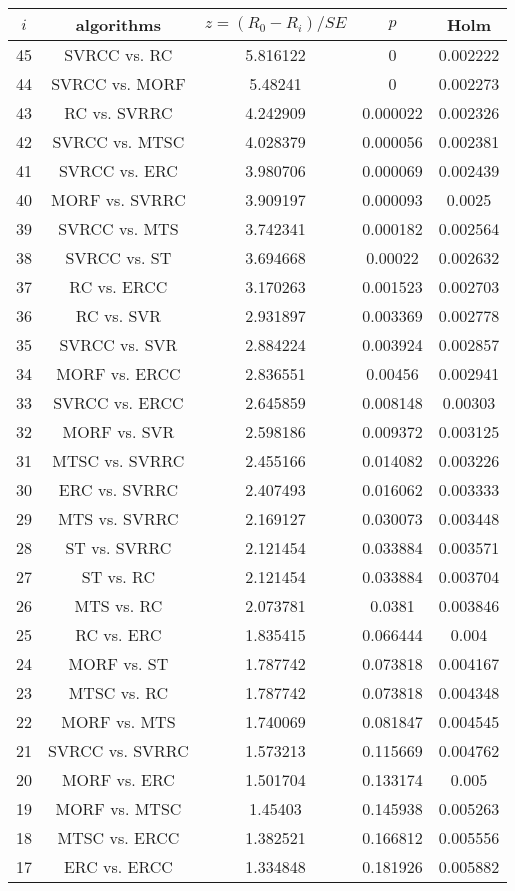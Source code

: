 \documentclass[a4paper,10pt]{article}
\begin{document}
\begin{landscape}
\begin{table}[!htp]
\centering\scriptsize
\begin{tabular}{ccccc}
$i$&algorithms&$z=(R_0 - R_i)/SE$&$p$&Holm\\
\hline45&SVRCC vs. RC&5.816122&0&0.002222\\
44&SVRCC vs. MORF&5.48241&0&0.002273\\
43&RC vs. SVRRC&4.242909&0.000022&0.002326\\
42&SVRCC vs. MTSC&4.028379&0.000056&0.002381\\
41&SVRCC vs. ERC&3.980706&0.000069&0.002439\\
40&MORF vs. SVRRC&3.909197&0.000093&0.0025\\
39&SVRCC vs. MTS&3.742341&0.000182&0.002564\\
38&SVRCC vs. ST&3.694668&0.00022&0.002632\\
37&RC vs. ERCC&3.170263&0.001523&0.002703\\
36&RC vs. SVR&2.931897&0.003369&0.002778\\
35&SVRCC vs. SVR&2.884224&0.003924&0.002857\\
34&MORF vs. ERCC&2.836551&0.00456&0.002941\\
33&SVRCC vs. ERCC&2.645859&0.008148&0.00303\\
32&MORF vs. SVR&2.598186&0.009372&0.003125\\
31&MTSC vs. SVRRC&2.455166&0.014082&0.003226\\
30&ERC vs. SVRRC&2.407493&0.016062&0.003333\\
29&MTS vs. SVRRC&2.169127&0.030073&0.003448\\
28&ST vs. SVRRC&2.121454&0.033884&0.003571\\
27&ST vs. RC&2.121454&0.033884&0.003704\\
26&MTS vs. RC&2.073781&0.0381&0.003846\\
25&RC vs. ERC&1.835415&0.066444&0.004\\
24&MORF vs. ST&1.787742&0.073818&0.004167\\
23&MTSC vs. RC&1.787742&0.073818&0.004348\\
22&MORF vs. MTS&1.740069&0.081847&0.004545\\
21&SVRCC vs. SVRRC&1.573213&0.115669&0.004762\\
20&MORF vs. ERC&1.501704&0.133174&0.005\\
19&MORF vs. MTSC&1.45403&0.145938&0.005263\\
18&MTSC vs. ERCC&1.382521&0.166812&0.005556\\
17&ERC vs. ERCC&1.334848&0.181926&0.005882\\

\end{tabular}
\end{table}
\end{landscape}
\end{document}
